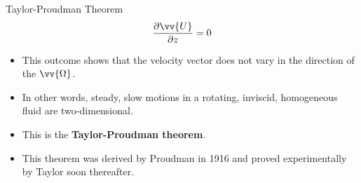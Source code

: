 \begin{frame}{Taylor-Proudman Theorem}
$$\frac{\partial \vv{U}}{\partial z} = 0$$
\begin{itemize}
	\item This outcome shows that the velocity vector does not vary in the direction of the $\vv{\Omega}$.
	\item In other words, steady, slow motions in a rotating, inviscid, homogeneous fluid are two-dimensional.
	\item This is the \textbf{Taylor-Proudman theorem}.
	\item This theorem was derived by Proudman in 1916 and proved experimentally by Taylor soon thereafter.
\end{itemize}
\end{frame}


